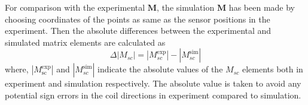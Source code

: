 
For comparison with the experimental $\bm{M}$, the simulation $\bm{M}$
has been made by choosing coordinates of the points as same as the
sensor positions in the experiment. Then the absolute differences
between the experimental and simulated matrix elements are calculated
as
\begin{equation}
    \Delta|M_{sc}|=|M_{sc}^{\text{exp}}|-|M_{sc}^{\text{sim}}|
\end{equation}
where, $|M_{\text{sc}}^{\text{exp}}|$ and $|M_{sc}^{\text{sim}}|$
indicate the absolute values of the $M_{sc}$ elements both in
experiment and simulation respectively.  The absolute value is taken
to avoid any potential sign errors in the coil directions in
experiment compared to simulation.





